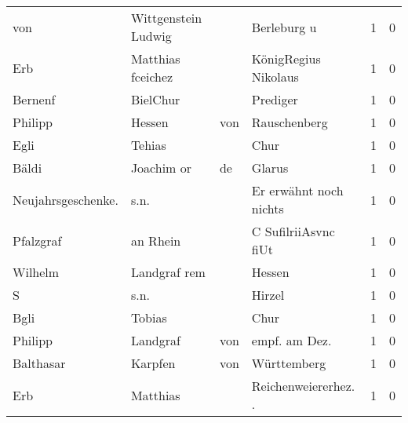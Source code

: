\documentclass[10pt,a4paper,landscape]{article}
\begin{document}
\begin{longtable}{llllrr}
                      von &                Wittgenstein Ludwig &             &                                 Berleburg u &          1 &         0 \\
                      Erb &                  Matthias fceichez &             &                        KönigRegius Nikolaus &          1 &         0 \\
                  Bernenf &                           BielChur &             &                                    Prediger &          1 &         0 \\
                  Philipp &                             Hessen &         von &                                Rauschenberg &          1 &         0 \\
                     Egli &                             Tehias &             &                                        Chur &          1 &         0 \\
                    Bäldi &                         Joachim or &          de &                                      Glarus &          1 &         0 \\
       Neujahrsgeschenke. &                               s.n. &             &                      Er erwähnt noch nichts &          1 &         0 \\
                Pfalzgraf &                           an Rhein &             &                        C SufilriiAsvnc fiUt &          1 &         0 \\
                  Wilhelm &                       Landgraf rem &             &                                      Hessen &          1 &         0 \\
                        S &                               s.n. &             &                                      Hirzel &          1 &         0 \\
                     Bgli &                             Tobias &             &                                        Chur &          1 &         0 \\
                  Philipp &                           Landgraf &         von &                              empf. am Dez.  &          1 &         0 \\
                Balthasar &                            Karpfen &         von &                                 Württemberg &          1 &         0 \\
                      Erb &                           Matthias &             &                       Reichenweiererhez. .  &          1 &         0 \\

\end{longtable}
\end{document}
